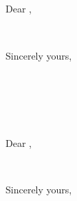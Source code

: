 \documentclass[12pt]{letter}
\begin{document}
\begin{letter}{ %
  \\
  \\
  \\
  }

\opening{Dear ,}



\closing{Sincerely yours,}
\end{letter}
\begin{letter}{ %
  \\
  \\
  \\
  }

\opening{Dear ,}



\closing{Sincerely yours,}
\end{letter}
\end{document}
